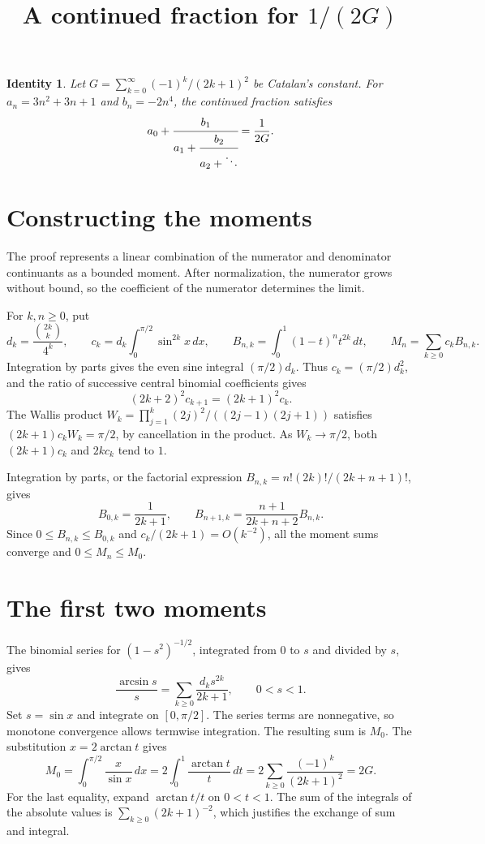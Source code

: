 \documentclass[11pt]{article}
\title{A continued fraction for \(1/(2G)\)}
\author{}
\date{}
\newtheorem*{theorem}{Identity}
\begin{document}
\maketitle
\thispagestyle{proofguide}
\vspace{-3em}

\begin{theorem}
Let \(G=\sum_{k=0}^{\infty}(-1)^k/(2k+1)^2\) be Catalan's constant.
For \(a_n=3n^2+3n+1\) and \(b_n=-2n^4\), the continued fraction satisfies
\[
  a_0+\cfrac{b_1}{a_1+\cfrac{b_2}{a_2+\ddots}}=\frac{1}{2G}.
\]
\end{theorem}

\section{Constructing the moments}

The proof represents a linear combination of the numerator and denominator
continuants as a bounded moment. After normalization, the numerator grows
without bound, so the coefficient of the numerator determines the limit.

For \(k,n\ge0\), put
\[
 d_k=\frac{\binom{2k}{k}}{4^k},\qquad
 c_k=d_k\int_0^{\pi/2}\sin^{2k}x\,dx,\qquad
 B_{n,k}=\int_0^1(1-t)^n t^{2k}\,dt,\qquad
 M_n=\sum_{k\ge0} c_k B_{n,k}.
\]
Integration by parts gives the even sine integral \((\pi/2)d_k\).
Thus \(c_k=(\pi/2)d_k^2\), and the ratio of successive central binomial
coefficients gives
\begin{equation}
 (2k+2)^2 c_{k+1}=(2k+1)^2 c_k.
 \label{eq:coeff}
\end{equation}
The Wallis product \(W_k=\prod_{j=1}^k(2j)^2/((2j-1)(2j+1))\)
satisfies \((2k+1)c_kW_k=\pi/2\), by cancellation in the product.
As \(W_k\to\pi/2\), both \((2k+1)c_k\) and \(2kc_k\) tend to \(1\).

Integration by parts, or the factorial expression
\(B_{n,k}=n!(2k)!/(2k+n+1)!\), gives
\begin{equation}
 B_{0,k}=\frac{1}{2k+1},\qquad
 B_{n+1,k}=\frac{n+1}{2k+n+2}B_{n,k}.
 \label{eq:beta}
\end{equation}
Since \(0\le B_{n,k}\le B_{0,k}\) and \(c_k/(2k+1)=O(k^{-2})\),
all the moment sums converge and \(0\le M_n\le M_0\).

\newpage
\section{The first two moments}

The binomial series for \((1-s^2)^{-1/2}\), integrated from \(0\) to \(s\)
and divided by \(s\), gives
\[
 \frac{\arcsin s}{s}=\sum_{k\ge0}\frac{d_k s^{2k}}{2k+1},
 \qquad 0<s<1.
\]
Set \(s=\sin x\) and integrate on \([0,\pi/2]\). The series terms are
nonnegative, so monotone convergence allows termwise integration.
The resulting sum is \(M_0\). The substitution \(x=2\arctan t\) gives
\[
 M_0=\int_0^{\pi/2}\frac{x}{\sin x}\,dx
     =2\int_0^1\frac{\arctan t}{t}\,dt
     =2\sum_{k\ge0}\frac{(-1)^k}{(2k+1)^2}=2G.
\]
For the last equality, expand \(\arctan t/t\) on \(0<t<1\). The sum of
the integrals of the absolute values is \(\sum_{k\ge0}(2k+1)^{-2}\),
which justifies the exchange of sum and integral.
\end{document}
